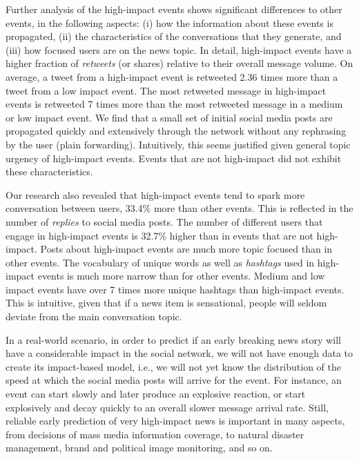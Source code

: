 Further analysis of the high-impact events shows significant
differences to other events, in the following aspects: (i) how the
information about these events is propagated, (ii) the characteristics
of the conversations that they generate, and (iii) how focused users
are on the news topic. In detail, high-impact events have a higher
fraction of {\em retweets} (or shares) relative to their overall
message volume. On average, a tweet from a high-impact event is
retweeted 2.36 times more than a tweet from a low impact event. The
most retweeted message in high-impact events is retweeted 7 times more
than the most retweeted message in a medium or low impact event. We
find that a small set of initial social media posts are propagated
quickly and extensively through the network without any rephrasing by
the user (plain forwarding). Intuitively, this seems justified given
general topic urgency of high-impact events. Events that are not
high-impact did not exhibit these characteristics.

Our research also revealed that high-impact events tend to spark more conversation
between users, 33.4\% more than other events. This is reflected in the
number of {\em replies} to social media posts. The number of different
users that engage in high-impact events is 32.7\% higher than in
events that are not high-impact. Posts about high-impact events are
much more topic focused than in other events. The vocabulary of unique
words as well as {\em hashtags} used in high-impact events is much
more narrow than for other events. Medium and low impact events have
over 7 times more unique hashtags than high-impact events. This is
intuitive, given that if a news item is sensational, people will
seldom deviate from the main conversation topic.


In a real-world scenario, in order to predict if an early breaking
news story will have a considerable impact in the social network, we
will not have enough data to create its impact-based model, i.e., we
will not yet know the distribution of the speed at which the social
media posts will arrive for the event. For instance, an event can
start slowly and later produce an explosive reaction, or start
explosively and decay quickly to an overall slower message arrival
rate. Still, reliable early prediction of very high-impact news is
important in many aspects, from decisions of mass media information
coverage, to natural disaster management, brand and political image
monitoring, and so on.

